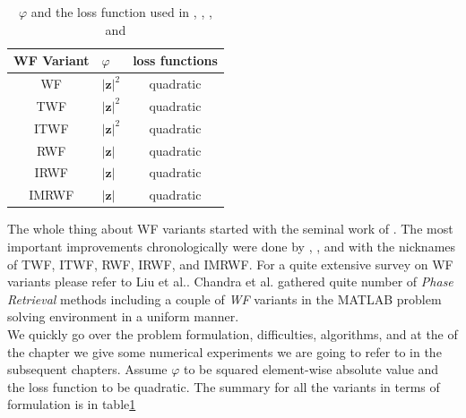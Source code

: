 \begin{table}
	\centering
	\begin{tabular}{||c l c||} 
	 \hline
	 \ac{WF} Variant & $\varphi$ 						& loss functions\\ [0.5ex] 
	 \hline\hline
	 \ac{WF}\index{WF}                & $\left|\boldsymbol{z}\right|^2$ 	& quadratic 	\\
	 \ac{TWF}\index{TWF}   & $\left|\boldsymbol{z}\right|^2$ 	& quadratic 	\\
	 \ac{ITWF}\index{ITWF}  & $\left|\boldsymbol{z}\right|^2$   & quadratic 	\\
	 \ac{RWF}\index{RWF}  & $\left|\boldsymbol{z}\right|$ 	& quadratic 	\\
	 \ac{IRWF}\index{IRWF}   & $\left|\boldsymbol{z}\right|$ 	& quadratic 	\\
	 \ac{IMRWF}\index{IMRWF}   & $\left|\boldsymbol{z}\right|$ 	& quadratic 	\\ [1ex]
	 \hline
	\end{tabular}
	\caption{$\varphi$ and the loss function used in \cite{Candes2014}, \cite{Chen2015}, \cite{Kolte2016}, and \cite{Zhang2016}}
	\label{tab:formulation}
	\end{table}




	The whole thing about \ac{WF} variants started with the seminal work of \cite{Candes2014}.
	The most important improvements chronologically were done by \cite{Chen2015}, \cite{Kolte2016}, and\cite{Zhang2016}
	with the nicknames of \ac{TWF}, \ac{ITWF}, \ac{RWF}, \ac{IRWF}, and \ac{IMRWF}.
	For a quite extensive survey on \ac{WF} variants please refer to Liu et al.\cite{Liu2019}. Chandra et al.\cite{Chandra2017} 
	gathered quite number of \emph{Phase Retrieval} methods including a couple of \emph{\ac{WF}} variants in the MATLAB\textregistered\space 
	problem solving environment in a uniform manner.\\
	We quickly go over the problem formulation, difficulties, algorithms, and at the of the chapter we give some numerical experiments we are going
	to refer to in the subsequent chapters. Assume $\varphi$ to be squared element-wise absolute value and the loss function to be quadratic. 
	The summary for all the variants in terms of formulation is in table\ref{tab:formulation}  
	
